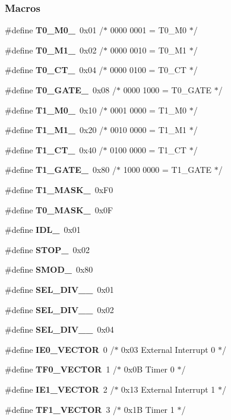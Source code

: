 \subsubsection*{Macros}
\begin{DoxyCompactItemize}
\item 
\#define {\bf T0\+\_\+\+M0\+\_\+}~0x01 /$\ast$ 0000 0001 = T0\+\_\+\+M0 $\ast$/
\item 
\#define {\bf T0\+\_\+\+M1\+\_\+}~0x02 /$\ast$ 0000 0010 = T0\+\_\+\+M1 $\ast$/
\item 
\#define {\bf T0\+\_\+\+C\+T\+\_\+}~0x04 /$\ast$ 0000 0100 = T0\+\_\+\+C\+T $\ast$/
\item 
\#define {\bf T0\+\_\+\+G\+A\+T\+E\+\_\+}~0x08 /$\ast$ 0000 1000 = T0\+\_\+\+G\+A\+T\+E $\ast$/
\item 
\#define {\bf T1\+\_\+\+M0\+\_\+}~0x10 /$\ast$ 0001 0000 = T1\+\_\+\+M0 $\ast$/
\item 
\#define {\bf T1\+\_\+\+M1\+\_\+}~0x20 /$\ast$ 0010 0000 = T1\+\_\+\+M1 $\ast$/
\item 
\#define {\bf T1\+\_\+\+C\+T\+\_\+}~0x40 /$\ast$ 0100 0000 = T1\+\_\+\+C\+T $\ast$/
\item 
\#define {\bf T1\+\_\+\+G\+A\+T\+E\+\_\+}~0x80 /$\ast$ 1000 0000 = T1\+\_\+\+G\+A\+T\+E $\ast$/
\item 
\#define {\bf T1\+\_\+\+M\+A\+S\+K\+\_\+}~0x\+F0
\item 
\#define {\bf T0\+\_\+\+M\+A\+S\+K\+\_\+}~0x0F
\item 
\#define {\bf I\+D\+L\+\_\+}~0x01
\item 
\#define {\bf S\+T\+O\+P\+\_\+}~0x02
\item 
\#define {\bf S\+M\+O\+D\+\_\+}~0x80
\item 
\#define {\bf S\+E\+L\+\_\+\+D\+I\+V\+\_\+\_\+}~0x01
\item 
\#define {\bf S\+E\+L\+\_\+\+D\+I\+V\+\_\+\_\+}~0x02
\item 
\#define {\bf S\+E\+L\+\_\+\+D\+I\+V\+\_\+\_\+}~0x04
\item 
\#define {\bf I\+E0\+\_\+\+V\+E\+C\+T\+OR}~0  /$\ast$ 0x03 External Interrupt 0 $\ast$/
\item 
\#define {\bf T\+F0\+\_\+\+V\+E\+C\+T\+OR}~1  /$\ast$ 0x0\+B Timer 0 $\ast$/
\item 
\#define {\bf I\+E1\+\_\+\+V\+E\+C\+T\+OR}~2  /$\ast$ 0x13 External Interrupt 1 $\ast$/
\item 
\#define {\bf T\+F1\+\_\+\+V\+E\+C\+T\+OR}~3  /$\ast$ 0x1\+B Timer 1 $\ast$/
\item 

\end{DoxyCompactItemize}
